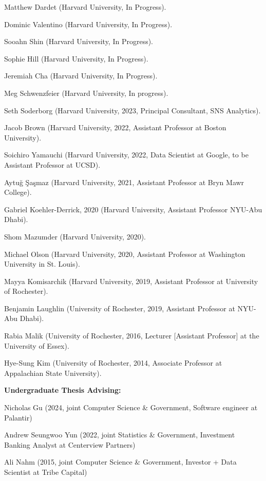 \documentclass[11pt,article,oneside]{memoir}
\begin{document}
\begin{cvlist}
  \begin{cvlist}
\item Matthew Dardet (Harvard University, In Progress).
\item Dominic Valentino (Harvard University, In Progress).
\item Sooahn Shin (Harvard University, In Progress).
\item Sophie Hill (Harvard University, In Progress).
\item Jeremiah Cha (Harvard University, In Progress).
\item Meg Schwenzfeier (Harvard University, In progress).
\item Seth Soderborg (Harvard University, 2023, Principal Consultant, SNS Analytics).
\item Jacob Brown (Harvard University, 2022, Assistant Professor at Boston University).
\item Soichiro Yamauchi (Harvard University, 2022, Data Scientist at Google, to be Assistant Professor at UCSD).
\item Aytu\u{g} \c{S}a\c{s}maz (Harvard University, 2021, Assistant Professor at Bryn Mawr College).
\item Gabriel Koehler-Derrick, 2020 (Harvard University, Assistant Professor NYU-Abu Dhabi).
\item Shom Mazumder (Harvard University, 2020).
\item Michael Olson (Harvard University, 2020, Assistant Professor at Washington University in St. Louis).
\item Mayya Komisarchik (Harvard University, 2019, Assistant Professor at University of Rochester).
\item Benjamin Laughlin (University of Rochester, 2019, Assistant Professor at NYU-Abu Dhabi).
\item Rabia Malik (University of Rochester, 2016, Lecturer [Assistant Professor] at the University of Essex).
\item Hye-Sung Kim (University of Rochester, 2014, Associate Professor at Appalachian State University).

\end{cvlist}

\item \textbf{Undergraduate Thesis Advising:}
\begin{cvlist}
\item Nicholas Gu (2024, joint Computer Science \& Government, Software engineer at Palantir)
\item Andrew Seungwoo Yun (2022, joint Statistics \& Government, Investment Banking Analyst at Centerview Partners)
\item Ali Nahm (2015, joint Computer Science \& Government, Investor + Data Scientist at Tribe Capital)
\end{cvlist}


\end{cvlist}
\end{document}
